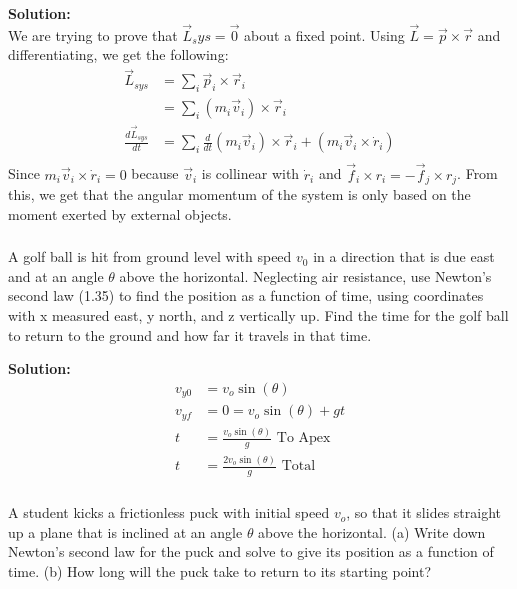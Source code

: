\documentclass{article}
\newcommand\Problem{%
    \subsubsection{}%
}
\newcommand\TheSolution{%
  \textbf{Solution:}\\%
}
\begin{document}
\TheSolution
We are trying to prove that $\vec{L}_sys = \vec{0}$ about a fixed point. Using $\vec{L} = \vec{p} \times \vec{r}$ and differentiating, we get the following:
\begin{equation}
    \begin{aligned}
        \vec{L}_{sys}             & = \sum_i \vec{p}_i \times \vec{r}_i                                                      \\
                                  & = \sum_i (m_i \vec{v}_i) \times \vec{r}_i                                                \\
        \frac{d\vec{L}_{sys}}{dt} & = \sum_i \frac{d}{dt}(m_i \vec{v}_i) \times \vec{r}_i + (m_i \vec{v}_i \times \dot{r}_i) \\
    \end{aligned}
\end{equation}
Since $m_i \vec{v}_i \times \dot{r}_i = 0$ because $\vec{v}_i$ is collinear with $\dot{r}_i$ and $\vec{f}_i \times r_i = -\vec{f}_j \times r_j$. From this, we get that the angular momentum of the system is only based on the moment exerted by external objects.

\Problem
A golf ball is hit from ground level with speed $v_0$ in a direction that is due east and at an angle $\theta$ above the horizontal. Neglecting air resistance, use Newton's second law (1.35) to find the position as a function of time, using coordinates with x measured east, y north, and z vertically up. Find the time for the golf ball to return to the ground and how far it travels in that time.

\TheSolution
\begin{equation}
    \begin{aligned}
        v_{y0} & = v_o \sin(\theta)                            \\
        v_{yf} & = 0 = v_o \sin(\theta) + gt                   \\
        t      & = \frac{v_o \sin(\theta)}{g} \text{ To Apex}  \\
        t      & = {\frac{2v_o \sin(\theta)}{g} \text{ Total}}
    \end{aligned}
\end{equation}

\Problem
A student kicks a frictionless puck with initial speed $v_o$, so that it slides straight up a plane that is inclined at an angle $\theta$ above the horizontal. (a) Write down Newton's second law for the puck and solve to give its position as a function of time. (b) How long will the puck take to return to its starting point?
\end{document}
